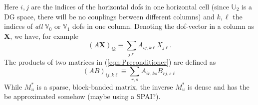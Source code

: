 \documentclass[10pt]{article}
\newcommand{\Uspace}{\mathbb{U}}
\newcommand{\Vspace}{\mathbb{V}}
\renewcommand{\vec}[1]{\boldsymbol{#1}}
\begin{document}
Here $i,j$ are the indices of the horizontal dofs in one horizontal cell (since $\Uspace_2$ is a DG space, there will be no couplings between different columns) and $k,\ell$ the indices of \textit{all} $\Vspace_0$ or $\Vspace_1$ dofs in one column.   Denoting the dof-vector in a column as $\vec{X}$, we have, for example
\begin{equation}
  \left(A\vec{X}\right)_{ik} \equiv \sum_{j\ell} A_{ij,k\ell} X_{j\ell}.
\end{equation}
The products of two matrices in (\ref{eqn:Preconditioner}) are defined as
\begin{equation}
  \left(AB\right)_{ij,k\ell} \equiv \sum_{r,s} A_{ir,ks}B_{rj,s\ell}
\end{equation}
While $M_u^*$ is a sparse, block-banded matrix, the inverse $M_u^*$ is dense and has the be approximated somehow (maybe using a SPAI?).


\end{document}
